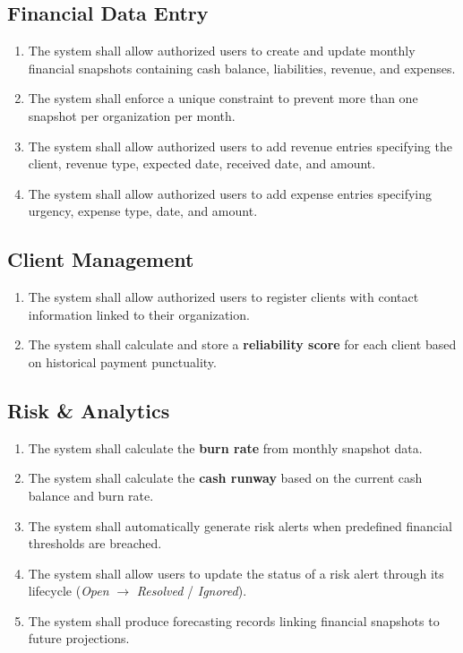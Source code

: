 \documentclass[12pt,a4paper]{article}
\begin{document}
\subsection{Financial Data Entry}
\begin{enumerate}[label=FR-\arabic*., leftmargin=2cm, start=8]
    \item The system shall allow authorized users to create and update monthly
          financial snapshots containing cash balance, liabilities, revenue,
          and expenses.
    \item The system shall enforce a unique constraint to prevent more than one
          snapshot per organization per month.
    \item The system shall allow authorized users to add revenue entries
          specifying the client, revenue type, expected date, received date,
          and amount.
    \item The system shall allow authorized users to add expense entries
          specifying urgency, expense type, date, and amount.
\end{enumerate}

\subsection{Client Management}
\begin{enumerate}[label=FR-\arabic*., leftmargin=2cm, start=12]
    \item The system shall allow authorized users to register clients with
          contact information linked to their organization.
    \item The system shall calculate and store a \textbf{reliability score}
          for each client based on historical payment punctuality.
\end{enumerate}

\subsection{Risk \& Analytics}
\begin{enumerate}[label=FR-\arabic*., leftmargin=2cm, start=14]
    \item The system shall calculate the \textbf{burn rate} from monthly
          snapshot data.
    \item The system shall calculate the \textbf{cash runway} based on the
          current cash balance and burn rate.
    \item The system shall automatically generate risk alerts when predefined
          financial thresholds are breached.
    \item The system shall allow users to update the status of a risk alert
          through its lifecycle (\emph{Open} $\to$ \emph{Resolved} /
          \emph{Ignored}).
    \item The system shall produce forecasting records linking financial
          snapshots to future projections.
\end{enumerate}
\end{document}
